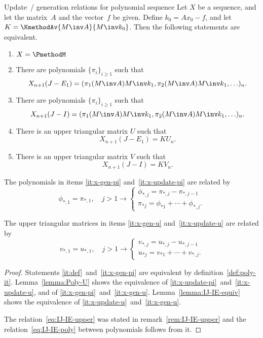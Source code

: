 \begin{llemma}{Update~/ generation relations for polynomial sequence}
  \label{Poly-4}\label{lemma:update-x}
  Let $X$ be a sequence, and let the matrix~$A$ and the vector~$f$ be
  given. Define $k_0=Ax_0-f$, and let $K=\KmethodAv{M\inv A}{M\inv k_0}$.
  Then the following statements are equivalent.
  \begin{enumerate}
  \item\label{it:def} $X=\PmethodM$
  \item\label{it:x-gen-pi}
    There are polynomials $\{\pi_i\}_{i\geq1}$ such that
    \[ X_{n+1}(J-E_1)=(\pi_1(M\inv A)M\inv k_1,\pi_2(M\inv A)M\inv
    k_1,\ldots)_n.
    \]
  \item\label{it:x-update-pi}
    There are polynomials $\{\pi_i\}_{i\geq1}$ such that
    \[ X_{n+1}(J-I)=(\pi_1(M\inv A)M\inv k_1,\pi_2(M\inv A)M\inv
    k_1,\ldots)_n. \]
  \item\label{it:x-gen-u}
    There is an upper triangular matrix $U$ such that
    \[ X_{n+1}(J-E_1)=KU_n. \]
  \item\label{it:x-update-u}
    There is an upper triangular matrix $V$ such that
    \[ X_{n+1}(J-I)=KV_n. \]
  \end{enumerate}
  The polynomials in items \ref{it:x-gen-pi} and~\ref{it:x-update-pi}
  are related by
  \begin{equation}
      \phi_{*,1}=\pi_{*,1},\quad j>1\rightarrow 
      \begin{cases}
        \phi_{*,j}=\pi_{*,j}-\pi_{*,j-1}  \\
        \pi_{*j} = \phi_{*1}+\cdots+\phi_{*,j}. 
      \end{cases}
    \label{eq:IJ-IE-poly}
  \end{equation}

  The upper triangular matrices in items \ref{it:x-gen-u} and~\ref{it:x-update-u}
  are related by
  \begin{equation}
      v_{*,1}=u_{*,1},\quad j>1\rightarrow 
      \begin{cases}
        v_{*,j}=u_{*,j}-u_{*,j-1}  \\
        u_{*j} = v_{*1}+\cdots+v_{*,j}. 
      \end{cases}
      \label{eq:IJ-IE-upper}
  \end{equation}
\end{llemma}
\begin{proof} Statements \ref{it:def}~and~\ref{it:x-gen-pi} are equivalent
by definition~\ref{def:poly-it}.
Lemma~\ref{lemma:Poly-U} shows the equivalence
of \ref{it:x-update-pi}~and~\ref{it:x-update-u}, and of
\ref{it:x-gen-pi}~and~\ref{it:x-gen-u}.
Lemma~\ref{lemma:IJ-IE-equiv} shows the equivalence
of \ref{it:x-update-u}~and~\ref{it:x-gen-u}.

The relation~\eqref{eq:IJ-IE-upper} was stated in remark~\ref{rem:IJ-IE-upper}
and the relation~\eqref{eq:IJ-IE-poly} between polynomials follows from it.
\end{proof}

